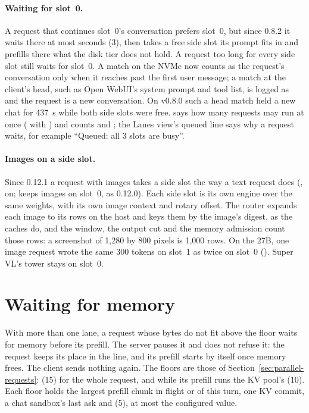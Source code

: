 \paragraph{Waiting for slot~0.} A request that continues slot~0's conversation prefers slot~0, but since 0.8.2 it waits there at most  seconds (3), then takes a free side slot its prompt fits in and prefills there what the disk tier does not hold. A request too long for every side slot still waits for slot~0. A match on the NVMe now counts as the request's conversation only when it reaches past the first user message; a match at the client's head, such as Open WebUI's system prompt and tool list, is logged as  and the request is a new conversation. On v0.8.0 such a head match held a new chat for 437~s while both side slots were free.   says how many requests may run at once ( with ) and counts  and ; the Lanes view's queued line says why a request waits, for example \enquote{Queued: all 3 slots are busy}.

\paragraph{Images on a side slot.} Since 0.12.1 a request with images takes a side slot the way a text request does (, on;  keeps images on slot~0, as 0.12.0). Each side slot is its own engine over the same weights, with its own image context and rotary offset. The router expands each image to its rows on the host and keys them by the image's digest, as the caches do, and the window, the output cut and the memory admission count those rows: a screenshot of 1,280 by 800 pixels is 1,000 rows. On the 27B, one image request wrote the same 300 tokens on slot~1 as twice on slot~0 (\measured). Super VL's tower stays on slot~0.

\section{Waiting for memory}\label{sec:memory-wait}

With more than one lane, a request whose bytes do not fit above the floor waits for memory before its prefill. The server pauses it and does not refuse it: the request keeps its place in the line, and its prefill starts by itself once memory frees. The client sends nothing again. The floors are those of Section~\ref{sec:parallel-requests}:  (15) for the whole request, and while its prefill runs the KV pool's  (10). Each floor holds the largest prefill chunk in flight or of this turn, one KV commit, a chat sandbox's last ask and  (5), at most the configured value.


